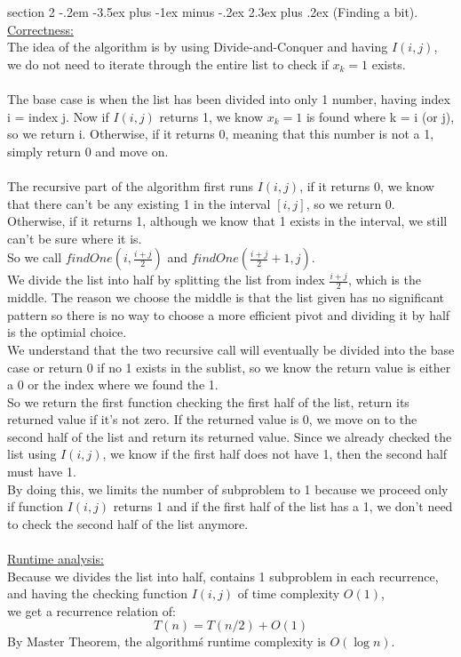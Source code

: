 \documentclass{article}
\makeatletter
\newenvironment{problem}{\@startsection
       {section}
       {2}
       {-.2em}
       {-3.5ex plus -1ex minus -.2ex}
       {2.3ex plus .2ex}
       {\pagebreak[3]%
       \large\bf\noindent{Problem }
       }
       }
\makeatother
\begin{document}
\begin{problem}{(Finding a bit).}
\noindent \underline{Correctness:}\\
The idea of the algorithm is by using Divide-and-Conquer and having \(I(i,j)\), we do not need to iterate through the entire list to check if \(x_k = 1\) exists.
\\ \hspace*{\fill} \\
The base case is when the list has been divided into only 1 number, having index i = index j. Now if \(I(i,j)\) returns 1,
we know \(x_k = 1\) is found where k = i (or j), so we return i. 
Otherwise, if it returns 0, meaning that this number is not a 1, simply return 0 and move on.
\\ \hspace*{\fill} \\
The recursive part of the algorithm first runs \(I(i,j)\), if it returns 0, we know that there can't be any existing 1 in the interval \([i,j]\), so we return 0.
Otherwise, if it returns 1, although we know that 1 exists in the interval, we still can't be sure where it is. \\
So we call \(findOne(i,\frac{i+j}{2})\) and \(findOne(\frac{i+j}{2} + 1,j)\).\\
We divide the list into half by splitting the list from index \(\frac{i+j}{2}\), which is the middle.
The reason we choose the middle is that the list given has no significant pattern so there is no way to choose a more efficient pivot and dividing it by half is the optimial choice.\\
We understand that the two recursive call will eventually be divided into the base case or return 0 if no 1 exists in the sublist, so we know the return value is either a 0 or the index where we found the 1.\\
So we return the first function checking the first half of the list, return its returned value if it's not zero. 
If the returned value is 0, we move on to the second half of the list and return its returned value. 
Since we already checked the list using \(I(i,j)\), we know if the first half does not have 1, then the second half must have 1.\\
By doing this, we limits the number of subproblem to 1 because we proceed only if function \(I(i,j)\) returns 1 and if the first half of the list has a 1, we don't need to check the second half of the list anymore.
\\ \hspace*{\fill} \\
\underline{Runtime analysis:}\\
Because we divides the list into half, contains 1 subproblem in each recurrence, and having the checking function \(I(i,j)\) of time complexity \(O(1)\),\\
we get a recurrence relation of:
\[T(n) = T(n/2) + O(1)\]
By Master Theorem, the algorithm\'s runtime complexity is \(O(\log n)\).




\end{problem}
\end{document}
